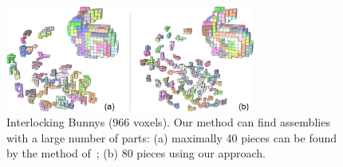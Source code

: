 %

 


\begin{figure}[!b]
	\centering
	\vspace*{-3.5mm}
	\includegraphics[width=8.20cm]{images/Result_Puzzle_Bunny.png}
	\vspace*{-2.5mm}
	\caption{
		Interlocking {\textsc Bunny}s  (966 voxels). Our method can find assemblies with a large number of parts:  (a)  maximally 40 pieces can be found by the method of~\cite{Song-2012-InterCubes}; (b) 80 pieces using our approach.	
	}
	\label{fig:Result_Puzzle_Bunny}
\end{figure}



